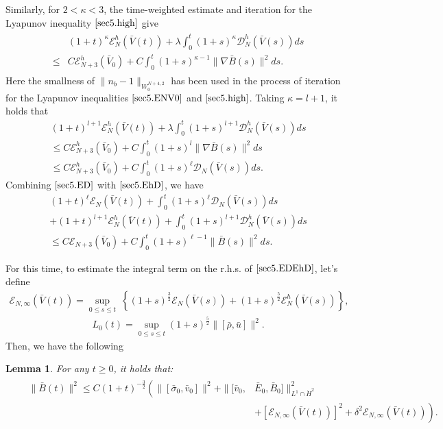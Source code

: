\documentclass[11pt]{amsart}
\newtheorem{lemma}{Lemma}[section]
\numberwithin{equation}{section}
\begin{document}
Similarly, for $2<\kappa<3$, the time-weighted estimate and
iteration for the Lyapunov inequality $\eqref{sec5.high}$ give
\begin{eqnarray*}
\begin{aligned}
 & (1+t)^{\kappa}\mathcal {E}_{N}^h(\bar{V}(t))+\lambda
 \int_{0}^{t}(1+s)^{\kappa}\mathcal {D}_{N}^h(\bar{V}(s))d s \\
 \leq & C \mathcal {E}_{N+3}^h(\bar{V}_{0})+ C
 \int_{0}^{t}(1+s)^{\kappa-1}\|
  \nabla\bar{B}(s)\|^{2}d s.
\end{aligned}
\end{eqnarray*}
Here the smallness of $\|n_{b}-1\|_{W_{0}^{N+4,2}}$ has been used in
the process of iteration for the Lyapunov inequalities
$\eqref{sec5.ENV0}$ and $\eqref{sec5.high}$. Taking $\kappa=l+1$, it
holds that
\begin{multline}\label{sec5.EhD}
(1+t)^{l+1}\mathcal {E}_{N}^h(\bar{V}(t))+\lambda
 \int_{0}^{t}(1+s)^{l+1}\mathcal {D}_{N}^h(\bar{V}(s))d s \\
 \leq  C \mathcal {E}_{N+3}^h(\bar{V}_{0})+ C
 \int_{0}^{t}(1+s)^{l}\|
  \nabla\bar{B}(s)\|^{2}d s\\
   \leq C \mathcal {E}_{N+3}^h(\bar{V}_{0})+ C \int_{0}^{t}(1+s)^{\ell}\mathcal {D}_{N}(\bar{V}(s))d s.
\end{multline}
Combining $\eqref{sec5.ED}$ with $\eqref{sec5.EhD}$, we have
\begin{multline}\label{sec5.EDEhD}
(1+t)^{\ell}\mathcal {E}_{N}(\bar{V}(t))+
 \int_{0}^{t}(1+s)^{\ell}\mathcal {D}_{N}(\bar{V}(s))d s\\
 +(1+t)^{l+1}\mathcal
{E}_{N}^h(\bar{V}(t))+
 \int_{0}^{t}(1+s)^{l+1}\mathcal {D}_{N}^h(\bar{V}(s))d s \\
 \leq  C \mathcal {E}_{N+3}(\bar{V}_{0})+ C \int_{0}^{t}(1+s)^{\ell-1}\|
  \bar{B}(s)\|^{2}d s.
\end{multline}

 For this time, to estimate the integral term on the r.h.s. of
$\eqref{sec5.EDEhD}$, let's define
\begin{eqnarray}\label{sec5.def}
\mathcal {E}_{N,\infty}(\bar{V}(t))=\sup\limits_{0\leq s \leq t} \
\left\{(1+s)^{\frac{3}{2}}\mathcal
{E}_{N}(\bar{V}(s))+(1+s)^{\frac{5}{2}}\mathcal
{E}_{N}^h(\bar{V}(s))\right\},
\end{eqnarray}
\begin{eqnarray}\label{sec5.defL}
L_{0}(t)=\sup\limits_{0\leq s \leq t}
(1+s)^{\frac{5}{2}}\|[\bar{\rho},\bar{u}]\|^{2}.
\end{eqnarray}
Then, we have the following
\begin{lemma}\label{lem.Bsigma}
For any $t\geq0$, it holds that:
\begin{eqnarray}\label{lem.tildeB}
&&\begin{aligned} \|\bar{B}(t)\|^2\leq C
(1+t)^{-\frac{3}{2}}\left(\|[\bar{\sigma}_{0},\bar{v}_{0}]\|^{2}+
 \|[\bar{v}_{0},\right.& \bar{E}_{0},\bar{B}_{0}]\|^2_{L^1\cap \dot{H}^{2}}\\
&\left.+[\mathcal {E}_{N,\infty}(\bar{V}(t))]^2+\delta^2 \mathcal
{E}_{N,\infty}(\bar{V}(t))\right).
\end{aligned}
\end{eqnarray}
\end{lemma}
\end{document}
